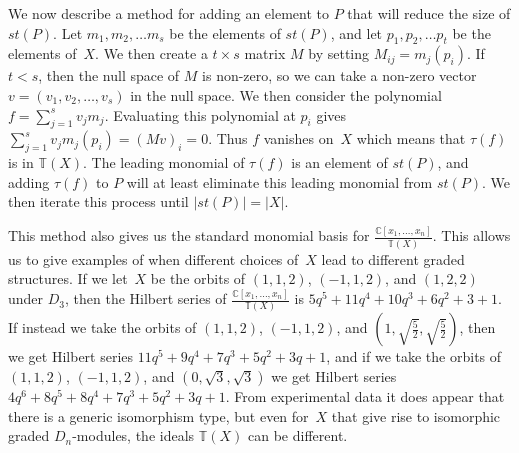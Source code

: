 \documentclass[10pt]{article}
\begin{document}
We now describe a method for adding an element to $P$ that will reduce the size of $st(P)$. Let $m_1,m_2,\ldots m_s$ be the 
elements of $st(P)$, and let $p_1,p_2,\ldots p_t$ be the elements of~$X$. We then create a $t\times s$ matrix $M$ by setting 
$M_{ij}=m_j(p_i)$. If $t<s$, then the null space of $M$ is non-zero, so we can take a non-zero vector $v=(v_1,v_2,\ldots, 
v_s)$ in the null space. We then consider the polynomial $f=\sum_{j=1}^s v_jm_j$. Evaluating this polynomial at $p_i$ gives 
$\sum_{j=1}^s v_jm_j(p_i)=(Mv)_i=0$. Thus $f$ vanishes on~$X$ which means that $\tau (f)$ is in $\mathbb{T}(X)$. The leading 
monomial of $\tau (f)$ is an element of $st(P)$, and adding $\tau (f)$ to $P$ will at least eliminate this leading monomial 
from $st(P)$. We then iterate this process until $\vert st(P)\vert =\vert X\vert$.


This method also gives us the standard monomial basis for $\frac{\mathbb{C}[x_1,\ldots, x_n]}{\mathbb{T}(X)}$. This allows us 
to give examples of when different choices of~$X$ lead to different graded structures. If we let~$X$ be the orbits of 
$(1,1,2)$, $(-1,1,2)$, and $(1,2,2)$ under $D_3$, then the Hilbert series of $\frac{\mathbb{C}[x_1,\ldots, 
x_n]}{\mathbb{T}(X)}$ is $5q^5+11q^4+10q^3+6q^2+3+1$. If instead we take the orbits of $(1,1,2)$, $(-1,1,2)$, and 
$(1,\sqrt{\frac{5}{2}},\sqrt{\frac{5}{2}})$, then we get Hilbert series $11q^5+9q^4+7q^3+5q^2+3q+1$, and if we take the orbits 
of $(1,1,2)$, $(-1,1,2)$, and $(0,\sqrt{3},\sqrt{3})$ we get Hilbert series $4q^6+8q^5+8q^4+7q^3+5q^2+3q+1$. From experimental 
data it does appear that there is a generic isomorphism type, but even for~$X$ that give rise to isomorphic graded 
$D_n$-modules, the ideals $\mathbb{T}(X)$ can be different.


 
\end{document}
